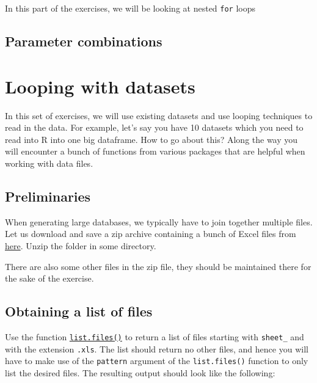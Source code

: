\documentclass[
]{book}
\begin{document}
In this part of the exercises, we will be looking at nested \texttt{for} loops

\hypertarget{parameter-combinations}{%
\section{Parameter combinations}\label{parameter-combinations}}

\hypertarget{looping-with-datasets}{%
\chapter{Looping with datasets}\label{looping-with-datasets}}

In this set of exercises, we will use existing
datasets and use looping techniques to read in the data.
For example, let's say you have 10 datasets which you
need to read into R into one big dataframe. How to go
about this? Along the way you will encounter a bunch of functions from
various packages that are helpful when working with data files.

\hypertarget{preliminaries}{%
\section{Preliminaries}\label{preliminaries}}

When generating large databases, we typically have to join together multiple files. Let us download and save a zip archive containing a bunch of Excel files from
\href{https://github.com/bramkuijper/stress/raw/master/figs/compare_dp/some_data.zip}{here}. Unzip the folder in some directory.

There are also some other files in the zip file, they should be maintained there for the sake of the exercise.

\hypertarget{obtaining-a-list-of-files}{%
\section{Obtaining a list of files}\label{obtaining-a-list-of-files}}

Use the function \href{https://stat.ethz.ch/R-manual/R-patched/library/base/html/list.files.html}{\texttt{list.files()}} to return a list of files starting with \texttt{sheet\_} and with the extension \texttt{.xls}. The list should return no other files, and hence you will have to make use of the \texttt{pattern} argument of the \texttt{list.files()} function to only list the desired files. The resulting output should look like the following:
\end{document}
